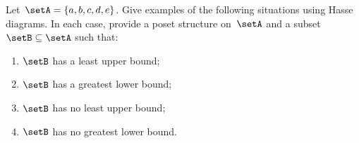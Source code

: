 \begin{definition}[Lattice]
\begin{gradedexercise} \label{ex:UpperLowerBounds}
Let~$\setA = \{a, b, c, d, e \}$. Give examples of the following situations using Hasse diagrams.
In each case, provide a poset structure on~$\setA$ and a subset~$\setB \subseteq \setA$ such that:
\begin{enumerate}
\item $\setB$ has a least upper bound;
\item $\setB$ has a greatest lower bound; 
\item $\setB$ has no least upper bound;
\item $\setB$ has no greatest lower bound. 
\end{enumerate}
\end{gradedexercise}




\end{definition}
